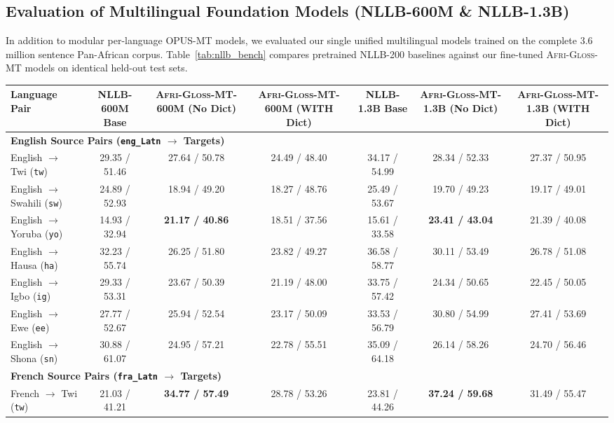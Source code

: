 \documentclass[10pt,twocolumn]{article}
\newcommand{\agm}{\textsc{Afri-Gloss-MT}}
\begin{document}
\subsection{Evaluation of Multilingual Foundation Models (NLLB-600M \& NLLB-1.3B)}
In addition to modular per-language OPUS-MT models, we evaluated our single unified multilingual models trained on the complete 3.6 million sentence Pan-African corpus. Table~\ref{tab:nllb_bench} compares pretrained NLLB-200 baselines against our fine-tuned \agm{} models on identical held-out test sets.

\begin{table}[t]
\centering
\small
\setlength{\tabcolsep}{4pt}
\begin{tabular}{lcccccc}
\toprule
\textbf{Language Pair} & \textbf{NLLB-600M Base} & \textbf{\agm{}-600M (No Dict)} & \textbf{\agm{}-600M (WITH Dict)} & \textbf{NLLB-1.3B Base} & \textbf{\agm{}-1.3B (No Dict)} & \textbf{\agm{}-1.3B (WITH Dict)} \\
\midrule
\multicolumn{7}{l}{\textbf{English Source Pairs (\texttt{eng\_Latn} $\rightarrow$ Targets)}} \\
English $\rightarrow$ Twi (\texttt{tw}) & 29.35 / 51.46 & 27.64 / 50.78 & 24.49 / 48.40 & 34.17 / 54.99 & 28.34 / 52.33 & 27.37 / 50.95 \\
English $\rightarrow$ Swahili (\texttt{sw}) & 24.89 / 52.93 & 18.94 / 49.20 & 18.27 / 48.76 & 25.49 / 53.67 & 19.70 / 49.23 & 19.17 / 49.01 \\
English $\rightarrow$ Yoruba (\texttt{yo}) & 14.93 / 32.94 & \textbf{21.17 / 40.86} & 18.51 / 37.56 & 15.61 / 33.58 & \textbf{23.41 / 43.04} & 21.39 / 40.08 \\
English $\rightarrow$ Hausa (\texttt{ha}) & 32.23 / 55.74 & 26.25 / 51.80 & 23.82 / 49.27 & 36.58 / 58.77 & 30.11 / 53.49 & 26.78 / 51.08 \\
English $\rightarrow$ Igbo (\texttt{ig}) & 29.33 / 53.31 & 23.67 / 50.39 & 21.19 / 48.00 & 33.75 / 57.42 & 24.34 / 50.65 & 22.45 / 50.05 \\
English $\rightarrow$ Ewe (\texttt{ee}) & 27.77 / 52.67 & 25.94 / 52.54 & 23.17 / 50.09 & 33.53 / 56.79 & 30.80 / 54.99 & 27.41 / 53.69 \\
English $\rightarrow$ Shona (\texttt{sn}) & 30.88 / 61.07 & 24.95 / 57.21 & 22.78 / 55.51 & 35.09 / 64.18 & 26.14 / 58.26 & 24.70 / 56.46 \\
\midrule
\multicolumn{7}{l}{\textbf{French Source Pairs (\texttt{fra\_Latn} $\rightarrow$ Targets)}} \\
French $\rightarrow$ Twi (\texttt{tw}) & 21.03 / 41.21 & \textbf{34.77 / 57.49} & 28.78 / 53.26 & 23.81 / 44.26 & \textbf{37.24 / 59.68} & 31.49 / 55.47 \\

\end{tabular}
\end{table}
\end{document}
